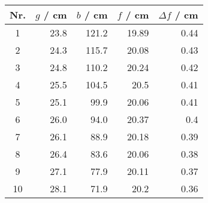 \begin{tabular}{c|rrrr}
Nr. & $g$ / cm & $b$ / cm & $f$ / cm & $\Delta f$ / cm \\
\hline
1 & 23.8 & 121.2 & 19.89 & 0.44\\
2 & 24.3 & 115.7 & 20.08 & 0.43\\
3 & 24.8 & 110.2 & 20.24 & 0.42\\
4 & 25.5 & 104.5 & 20.5 & 0.41\\
5 & 25.1 & 99.9 & 20.06 & 0.41\\
6 & 26.0 & 94.0 & 20.37 & 0.4\\
7 & 26.1 & 88.9 & 20.18 & 0.39\\
8 & 26.4 & 83.6 & 20.06 & 0.38\\
9 & 27.1 & 77.9 & 20.11 & 0.37\\
10 & 28.1 & 71.9 & 20.2 & 0.36
\end{tabular}

